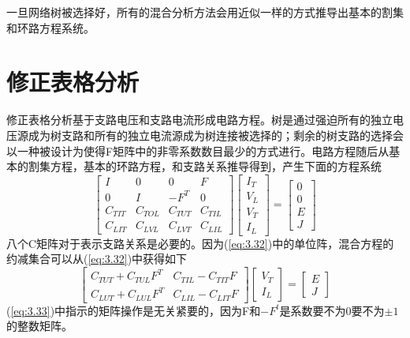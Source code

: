 一旦网络树被选择好，所有的混合分析方法会用近似一样的方式推导出基本的割集和环路方程系统。

\section{修正表格分析}
修正表格分析\cite{ref-28,ref-29}基于支路电压和支路电流形成电路方程。树是通过强迫所有的独立电压源成为树支路和所有的独立电流源成为树连接被选择的；剩余的树支路的选择会以一种被设计为使得F矩阵中的非零系数数目最少的方式进行\cite{ref-29}。电路方程随后从基本的割集方程，基本的环路方程，和支路关系推导得到，产生下面的方程系统
\begin{equation}
    \begin{bmatrix}
    I & 0 & 0 & F \\
    0 & I & -F^T & 0 \\
    C_{TIT} & C_{TOL} & C_{TUT} & C_{TIL} \\
    C_{LIT} & C_{LVL} & C_{LVT} & C_{LIL}
    \end{bmatrix}\begin{bmatrix}
    I_T \\
    V_L \\
    V_T \\
    I_L
    \end{bmatrix}=\begin{bmatrix}
    0 \\
    0 \\
    E \\
    J
    \end{bmatrix}
    \label{eq:3.32}
\end{equation}
八个C矩阵对于表示支路关系是必要的。因为(\ref{eq:3.32})中的单位阵，混合方程的约减集合可以从(\ref{eq:3.32})中获得如下
\begin{equation}
    \begin{bmatrix}
    C_{TUT} + C_{TUL}F^T & C_{TIL}-C_{TIT}F \\
    C_{LUT} + C_{LUL}F^T & C_{LIL}-C_{LIT}F
    \end{bmatrix}\begin{bmatrix}
    V_T \\
    I_L
    \end{bmatrix}=\begin{bmatrix}
    E \\
    J
    \end{bmatrix}
    \label{eq:3.33}
\end{equation}
(\ref{eq:3.33})中指示的矩阵操作是无关紧要的，因为F和$-F^t$是系数要不为0要不为$\pm 1$的整数矩阵。

